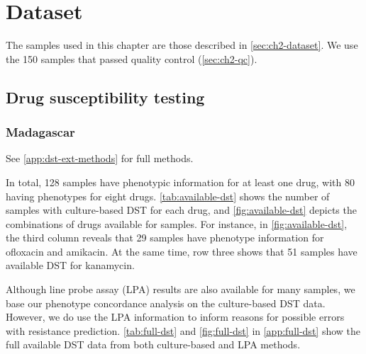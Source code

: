 \section{Dataset}

The \mtb{} samples used in this chapter are those described in \autoref{sec:ch2-dataset}. We use the 150 samples that passed quality control (\autoref{sec:ch2-qc}).

\subsection{Drug susceptibility testing}
\label{sec:dst-methods}


\subsubsection{Madagascar}

See \autoref{app:dst-ext-methods} for full methods.

\noindent
In total, 128 samples have phenotypic information for at least one drug, with 80 having phenotypes for eight drugs. \autoref{tab:available-dst} shows the number of samples with culture-based DST for each drug, and \autoref{fig:available-dst} depicts the combinations of drugs available for samples. For instance, in \autoref{fig:available-dst}, the third column reveals that 29 samples have phenotype information for ofloxacin and amikacin. At the same time, row three shows that 51 samples have available DST for kanamycin. 

Although line probe assay (LPA) results are also available for many samples, we base our phenotype concordance analysis on the culture-based DST data. However, we do use the LPA information to inform reasons for possible errors with resistance prediction. \autoref{tab:full-dst} and \autoref{fig:full-dst} in \autoref{app:full-dst} show the full available DST data from both culture-based and LPA methods.

